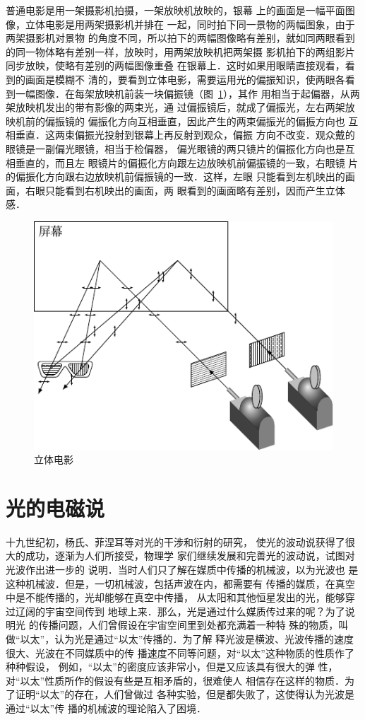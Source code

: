 普通电影是用一架摄影机拍摄，一架放映机放映的，银幕
上的画面是一幅平面图像，立体电影是用两架摄影机并排在
一起，同时拍下同一景物的两幅图象，由于两架摄影机对景物
的角度不同，所以拍下的两幅图像略有差别，就如同两眼看到
的同一物体略有差别一样，放映时，用两架放映机把两架摄
影机拍下的两组影片同步放映，使略有差别的两幅图像重叠
在银幕上．这时如果用眼睛直接观看，看到的画面是模糊不
清的，要看到立体电影，需要运用光的偏振知识，使两眼各看
到一幅图像．在每架放映机前装一块偏振镜（图~\ref{fig_C_6-15}），其作
用相当于起偏器，从两架放映机发出的带有影像的两束光，通
过偏振镜后，就成了偏振光，左右两架放映机前的偏振镜的
偏振化方向互相垂直，因此产生的两束偏振光的偏振方向也
互相垂直．这两束偏振光投射到银幕上再反射到观众，偏振
方向不改变．观众戴的眼镜是一副偏光眼镜，相当于检偏器，
偏光眼镜的两只镜片的偏振化方向也是互相垂直的，而且左
眼镜片的偏振化方向跟左边放映机前偏振镜的一致，右眼镜
片的偏振化方向跟右边放映机前偏振镜的一致．这样，左眼
只能看到左机映出的画面，右眼只能看到右机映出的画面，两
眼看到的画面略有差别，因而产生立体感．
\begin{figure}[htbp]
    \centering
    \includegraphics{fig/C/6-15.pdf}
    \caption{立体电影}\label{fig_C_6-15}
\end{figure}

\section{光的电磁说}
十九世纪初，杨氏、菲涅耳等对光的干涉和衍射的研究，
使光的波动说获得了很大的成功，逐渐为人们所接受，物理学
家们继续发展和完善光的波动说，试图对光波作出进一步的
说明．当时人们只了解在媒质中传播的机械波，以为光波也
是这种机械波．但是，一切机械波，包括声波在内，都需要有
传播的媒质，在真空中是不能传播的，光却能够在真空中传播，
从太阳和其他恒星发出的光，能够穿过辽阔的宇宙空间传到
地球上来．那么，光是通过什么媒质传过来的呢？为了说明光
的传播问题，人们曾假设在宇宙空间里到处都充满着一种特
殊的物质，叫做“以太”，认为光是通过“以太”传播的．为了解
释光波是横波、光波传播的速度很大、光波在不同媒质中的传
播速度不同等问题，对“以太”这种物质的性质作了种种假设，
例如，“以太”的密度应该非常小，但是又应该具有很大的弹
性，对“以太”性质所作的假设有些是互相矛盾的，很难使人
相信存在这样的物质．为了证明“以太”的存在，人们曾做过
各种实验，但是都失败了，这使得认为光波是通过“以太”传
播的机械波的理论陷入了困境．

